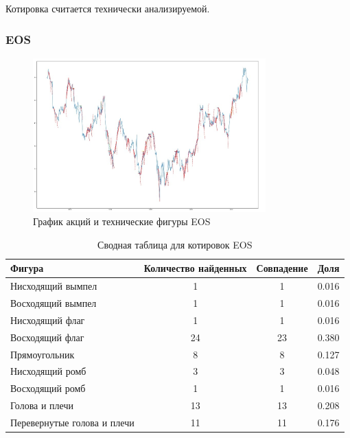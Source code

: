 \documentclass[bachelor, och, coursework]{SCWorks}
\begin{document}
        Котировка считается технически анализируемой.

        \subsubsection{EOS}
    
        \begin{figure}[H]
            \centering
            \includegraphics[width=0.8\textwidth]{pic/EOS.jpg}
            \caption{График акций и технические фигуры EOS}
        \end{figure}
       
        \begin{table}[!hbt]
            \centering
            \begin{tabular}{|l|c|c|c|}
            \hline
            Фигура                      & \multicolumn{1}{l|}{Количество найденных} & Совпадение & Доля  \\ \hline
            Нисходящий вымпел           & 1                                         & 1          & 0.016 \\ \hline
            Восходящий вымпел           & 1                                         & 1          & 0.016 \\ \hline
            Нисходящий флаг             & 1                                         & 1          & 0.016 \\ \hline
            Восходящий флаг             & 24                                        & 23         & 0.380  \\ \hline
            Прямоугольник               & 8                                         & 8          & 0.127  \\ \hline
            Нисходящий ромб             & 3                                         & 3          & 0.048 \\ \hline
            Восходящий ромб             & 1                                         & 1          & 0.016 \\ \hline
            Голова и плечи              & 13                                        & 13         & 0.208 \\ \hline
            Перевернутые голова и плечи & 11                                        & 11         & 0.176 \\ \hline
            \end{tabular}
            \captionsetup{justification=centering}
            \caption{Сводная таблица для котировок EOS}    
        \end{table}
        
\end{document}
